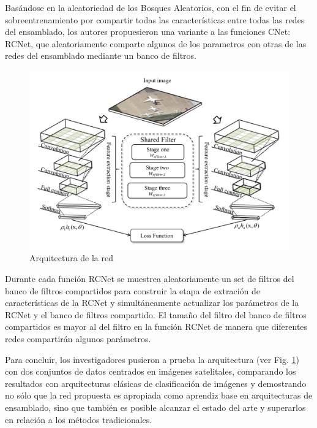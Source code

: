 Basándose en la aleatoriedad de los Bosques Aleatorios, con el fin de evitar el sobreentrenamiento por compartir todas las características entre todas las redes del ensamblado, los autores propuesieron una variante a las funciones CNet: RCNet, que aleatoriamente comparte algunos de los parametros con otras de las redes del ensamblado mediante un banco de filtros.

\begin{figure}[h]
	\centering
	\includegraphics[width=1\linewidth]{images/gbrcnn_architecture}
	\caption[Arquitectura de la red]{Arquitectura de la red}
	\label{fig:gbrcnnarchitecture}
\end{figure}


Durante cada función RCNet se muestrea aleatoriamente un set de filtros del banco de filtros compartidos para construir la etapa de extración de características de la RCNet y simultáneamente actualizar los parámetros de la RCNet y el banco de filtros compartido. El tamaño del filtro del banco de filtros compartidos es mayor al del filtro en la función RCNet de manera que diferentes redes compartirán algunos parámetros. 

Para concluir, los investigadores pusieron a prueba la arquitectura (ver Fig. \ref{fig:gbrcnnarchitecture}) con dos conjuntos de datos centrados en imágenes satelitales, comparando los resultados con arquitecturas clásicas de clasificación de imágenes y demostrando no sólo que la red propuesta es apropiada como aprendiz base en arquitecturas de ensamblado, sino que también es posible alcanzar el estado del arte y superarlos en relación a los métodos tradicionales.

